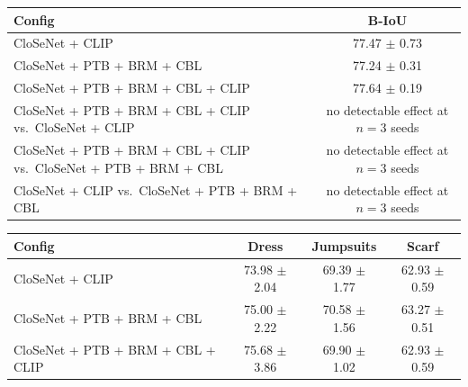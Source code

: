 \begin{tabular}{lc}
\toprule
Config & B-IoU \\
\midrule
CloSeNet + CLIP & 77.47 $\pm$ 0.73 \\
CloSeNet + PTB + BRM + CBL & 77.24 $\pm$ 0.31 \\
CloSeNet + PTB + BRM + CBL + CLIP & 77.64 $\pm$ 0.19 \\
\midrule
CloSeNet + PTB + BRM + CBL + CLIP vs.\ CloSeNet + CLIP & no detectable effect at $n{=}3$ seeds \\
CloSeNet + PTB + BRM + CBL + CLIP vs.\ CloSeNet + PTB + BRM + CBL & no detectable effect at $n{=}3$ seeds \\
CloSeNet + CLIP vs.\ CloSeNet + PTB + BRM + CBL & no detectable effect at $n{=}3$ seeds \\
\bottomrule
\end{tabular}

\begin{tabular}{lccc}
\toprule
Config & Dress & Jumpsuits & Scarf \\
\midrule
CloSeNet + CLIP & 73.98 $\pm$ 2.04 & 69.39 $\pm$ 1.77 & 62.93 $\pm$ 0.59 \\
CloSeNet + PTB + BRM + CBL & 75.00 $\pm$ 2.22 & 70.58 $\pm$ 1.56 & 63.27 $\pm$ 0.51 \\
CloSeNet + PTB + BRM + CBL + CLIP & 75.68 $\pm$ 3.86 & 69.90 $\pm$ 1.02 & 62.93 $\pm$ 0.59 \\
\bottomrule
\end{tabular}
